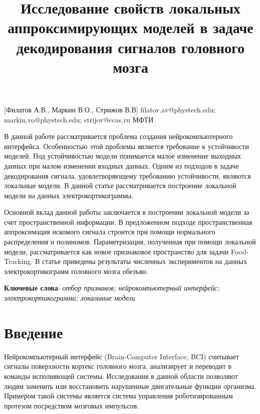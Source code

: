 \documentclass[12pt, twoside]{article}
\begin{document}
\title
    [Исследование свойств локальных моделей] %
    {Исследование свойств локальных аппроксимирующих моделей в задаче декодирования сигналов головного мозга}
\author
[] %
{} %
[Филатов А.В., Маркин В.О., Стрижов В.В] %
\email
{filatov.av@phystech.edu; markin.vo@phystech.edu; strijov@ccas.ru}
\organization
{МФТИ}
\abstract
    {
		В данной работе рассматривается проблема создания нейрокомпьютерного интерфейса. Особенностью этой проблемы является требование к устойчивости моделей. Под устойчивостью модели понимается малое изменение выходных данных при малом изменении входных данных. Одним из подходов в задаче декодирования сигнала, удовлетворяющему требованию устойчивости, являются локальные модели. В данной статье рассматривается построение локальной модели на данных электрокортикограммы.
		
		Основной вклад данной работы заключается в  построении локальной модели за счет пространственной информации. В предложенном подходе  пространственная аппроксимация искомого сигнала строится при помощи нормального распределения и полиномов. Параметризация, полученная при помощи локальной модели, рассматривается как новое признаковое пространство для задачи Food-Tracking. В статье приведены результаты численных экспериментов на данных электрокортикограмм головного мозга обезъян.
		
\bigskip
\noindent
\textbf{Ключевые слова}: \emph {отбор признаков; нейрокомпьютерный интерфейс; электрокортикограмма; локальные модели }
}

\maketitle
\section{Введение}
Нейрокомпьютерный интерфейс (Brain-Computer Interface, BCI) \cite{shih2012brain} 
считывает сигналы поверхности кортекс головного мозга, анализирует и переводит в команды исполняющей системы. Исследования в данной области позволяют людям заменить или восстановить нарушенные двигательные функции организма. Примером такой системы является система управления роботизированным протезом посредством мозговых импульсов. 
\end{document}
